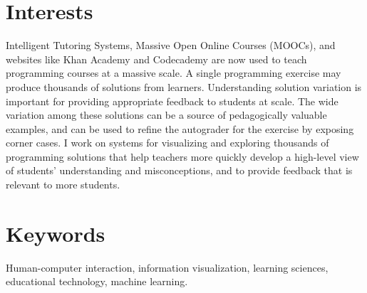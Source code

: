 \documentclass[margin]{res}
\begin{document}
 

 
\address{32 Vassar Street, Rm 32-G715\\Cambridge, MA 02139}
\address{ELG@MIT.edu\\
(215) 694-9631} 

 
\begin{resume} 
 
\section{Interests} 
Intelligent Tutoring Systems, Massive Open Online Courses (MOOCs), and websites like Khan Academy and Codecademy are now used to teach programming courses at a massive scale. A single programming exercise may produce thousands of solutions from learners. Understanding solution variation is important for providing appropriate feedback to students at scale. The wide variation among these solutions can be a source of pedagogically valuable examples, and can be used to refine the autograder for the exercise by exposing corner cases. I work on systems for visualizing and exploring thousands of programming solutions that help teachers more quickly develop a high-level view of students' understanding and misconceptions, and to provide feedback that is relevant to more students. 
\section{Keywords} 
Human-computer interaction, information visualization, learning sciences, educational technology, machine learning.


\end{resume}
\end{document}
